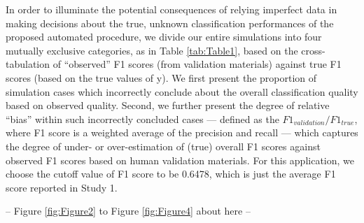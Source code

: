 \documentclass[man, 12pt, a4paper, nolmodern, noextraspace]{apa6}
\begin{document}
In order to illuminate the potential consequences of relying imperfect data in making decisions about the true, unknown classification performances of the proposed automated procedure, we divide our entire simulations into four mutually exclusive categories, as in Table \ref{tab:Table1}, based on the cross-tabulation of \enquote{observed} F1 scores (from validation materials) against true F1 scores (based on the true values of y). We first present the proportion of simulation cases which incorrectly conclude about the overall classification quality based on observed quality. Second, we further present the degree of relative \enquote{bias} within such incorrectly concluded cases --- defined as the $ F1_{validation}/F1_{true} $, where F1 score is a weighted average of the precision and recall --- which captures the degree of under- or over-estimation of (true) overall F1 scores against observed F1 scores based on human validation materials. For this application, we choose the cutoff value of F1 score to be 0.6478, which is just the average F1 score reported in Study 1.
\centerline{ -- Figure \ref{fig:Figure2} to Figure \ref{fig:Figure4} about here -- }    
\end{document}
